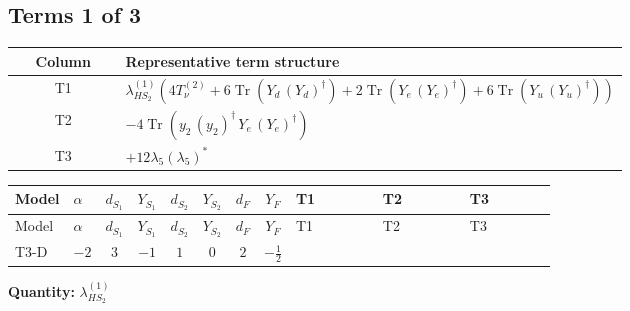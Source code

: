 \documentclass[8pt]{article}
\begin{document}
\begin{landscape}
\subsection*{Terms 1 of 3}
\begin{center}
\begin{tabular}{@{}c >{\raggedright\arraybackslash}p{0.82\linewidth}@{}}
\toprule
Column & Representative term structure \\
\midrule
T1 & \(\displaystyle {\lambda_{HS_2}^{(1)}} (4 T_{\nu}^{(2)}+6 \operatorname{Tr}\!\left({Y_d}\,\left({Y_d}\right)^{\dagger}\right)+2 \operatorname{Tr}\!\left({Y_e}\,\left({Y_e}\right)^{\dagger}\right)+6 \operatorname{Tr}\!\left({Y_u}\,\left({Y_u}\right)^{\dagger}\right))\) \\
\midrule
T2 & \(\displaystyle -4 \operatorname{Tr}\!\left({y_2}\,\left({y_2}\right)^{\dagger}\,{Y_e}\,\left({Y_e}\right)^{\dagger}\right)\) \\
\midrule
T3 & \(\displaystyle +12 {\lambda_5} \left({\lambda_5}\right)^{*}\) \\
\midrule
\bottomrule
\end{tabular}
\end{center}
\smallskip
\tiny
\begin{longtable}{@{}llcccccc >{\raggedright\arraybackslash}p{0.21\linewidth} >{\raggedright\arraybackslash}p{0.21\linewidth} >{\raggedright\arraybackslash}p{0.21\linewidth}@{}}
\toprule
Model & $\alpha$ & $d_{S_1}$ & $Y_{S_1}$ & $d_{S_2}$ & $Y_{S_2}$ & $d_F$ & $Y_F$ & T1 & T2 & T3 \\
\midrule
\endfirsthead
\toprule
Model & $\alpha$ & $d_{S_1}$ & $Y_{S_1}$ & $d_{S_2}$ & $Y_{S_2}$ & $d_F$ & $Y_F$ & T1 & T2 & T3 \\
\midrule
\endhead
T3-D & $-2$ & $3$ & $-1$ & $1$ & $0$ & $2$ & $-\frac{1}{2}$ & \scriptsize\adjustbox{max width=\linewidth}{$\begin{gathered} {\lambda_{HS_2}^{(1)}} (4 T_{\nu}^{(2)}+6 \operatorname{Tr}\!\left({Y_d}\,\left({Y_d}\right)^{\dagger}\right)+2 \operatorname{Tr}\!\left({Y_e}\,\left({Y_e}\right)^{\dagger}\right)+6 \operatorname{Tr}\!\left({Y_u}\,\left({Y_u}\right)^{\dagger}\right))\end{gathered}$} & \scriptsize\adjustbox{max width=\linewidth}{$\begin{gathered} -4 \operatorname{Tr}\!\left({y_2}\,\left({y_2}\right)^{\dagger}\,{Y_e}\,\left({Y_e}\right)^{\dagger}\right)\end{gathered}$} & \scriptsize\adjustbox{max width=\linewidth}{$\begin{gathered} +12 {\lambda_5} \left({\lambda_5}\right)^{*}\end{gathered}$} \\
\midrule
\bottomrule
\end{longtable}
\clearpage
\noindent\textbf{Quantity: }$\lambda_{HS_2}^{(1)}$\par\smallskip

\end{landscape}
\end{document}
